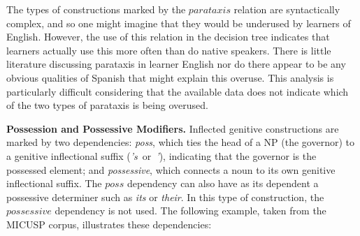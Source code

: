 \documentclass[main.tex]{subfiles}
\begin{document}
The types of constructions marked by the $parataxis$ relation are syntactically complex, and so one might imagine that they would be underused by learners of English. However, the use of this relation in the decision tree indicates that learners actually use this more often than do native speakers. There is little literature discussing parataxis in learner English nor do there appear to be any obvious qualities of Spanish that might explain this overuse. This analysis is particularly difficult considering that the available data does not indicate which of the two types of parataxis is being overused.


\textbf{Possession and Possessive Modifiers.} Inflected genitive constructions are marked by two dependencies: \textit{poss}, which ties the head of a NP (the governor) to a genitive inflectional suffix (\textit{'s}~or~\textit{'}), indicating that the governor is the possessed element; and \textit{possessive}, which connects a noun to its own genitive inflectional suffix. The $poss$ dependency can also have as its dependent a possessive determiner such as \textit{its} or \textit{their}. In this type of construction, the $possessive$ dependency is not used. The following example, taken from the MICUSP corpus, illustrates these dependencies:
\newline\newline{}
\newline
\end{document}

